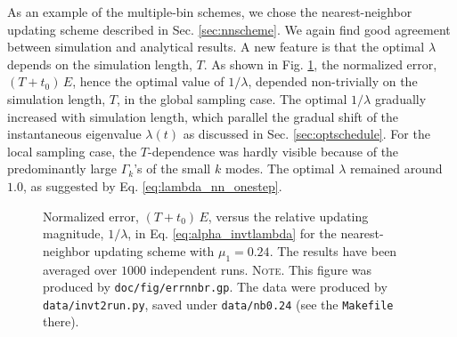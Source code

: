 \documentclass[reprint, floatfix]{revtex4-1}
\newcommand{\note}[1]{{\color{DarkGreen}\footnotesize \textsc{Note.} #1}}
\newcommand{\Err}{E}
\begin{document}
As an example of the multiple-bin schemes,
we chose the nearest-neighbor updating scheme
described in Sec. \eqref{sec:nnscheme}.
%
We again find good agreement
between simulation and analytical results.
%
A new feature is that the optimal $\lambda$
depends on the simulation length, $T$.
%
As shown in Fig. \ref{fig:errnnbr},
the normalized error, $(T + t_0) \, \Err$,
hence the optimal value of $1/\lambda$,
depended non-trivially on the simulation length, $T$,
in the global sampling case.
%
The optimal $1/\lambda$ gradually increased
with simulation length,
which parallel the gradual shift of
the instantaneous eigenvalue $\lambda(t)$
as discussed in Sec. \ref{sec:optschedule}.
%
For the local sampling case,
the $T$-dependence was hardly visible
because of the predominantly large $\Gamma_k$'s
of the small $k$ modes.
%
The optimal $\lambda$ remained around $1.0$,
as suggested by Eq. \eqref{eq:lambda_nn_onestep}.





\begin{figure}[h]
\begin{center}
  \caption{
    \label{fig:errnnbr}
    Normalized error, $(T + t_0) \, E$,
    versus the %
    relative updating magnitude,
    $1/\lambda$,
    in Eq. \eqref{eq:alpha_invtlambda}
    for the nearest-neighbor updating scheme with $\mu_1 = 0.24$.
    The results have been averaged over $1000$ independent runs.
    \note{This figure was produced by \texttt{doc/fig/errnnbr.gp}.
      The data were produced by \texttt{data/invt2run.py},
      saved under \texttt{data/nb0.24}
      (see the \texttt{Makefile} there).
    }%
  }
\end{center}
\end{figure}
\end{document}
